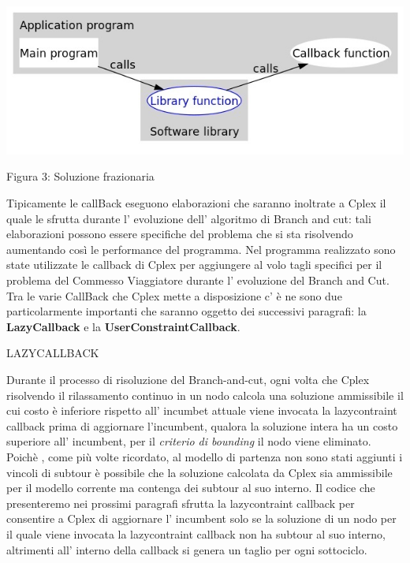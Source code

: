 \documentclass[11pt]{article}
\begin{document}
\begin{center}
\includegraphics[scale=0.5]{Callback}  

Figura 3: Soluzione frazionaria
\end{center}


Tipicamente le callBack eseguono elaborazioni che saranno inoltrate a Cplex il quale le sfrutta durante l' evoluzione dell' algoritmo di Branch and cut: tali elaborazioni possono essere specifiche del problema che si sta risolvendo aumentando così le performance del programma. Nel programma realizzato sono state utilizzate le callback di Cplex per aggiungere al volo tagli specifici per il problema del Commesso Viaggiatore durante l' evoluzione del Branch and Cut.
Tra le varie CallBack che Cplex mette a disposizione c' è ne sono due particolarmente importanti che saranno oggetto dei successivi paragrafi: la \textbf{LazyCallback} e la \textbf{UserConstraintCallback}.


\vspace{2\baselineskip}
LAZYCALLBACK
\vspace{2\baselineskip}

Durante il processo di risoluzione del Branch-and-cut, ogni volta che Cplex risolvendo il rilassamento continuo in un nodo calcola una soluzione ammissibile il cui costo è inferiore rispetto all' incumbet attuale viene invocata la lazycontraint callback prima di aggiornare l'incumbent, qualora la soluzione intera ha un costo superiore all' incumbent, per il \textit{criterio di bounding} il nodo viene eliminato. Poichè , come più volte ricordato, al modello di partenza non sono stati aggiunti i vincoli di subtour è possibile che la soluzione calcolata da Cplex sia ammissibile per il modello corrente ma contenga dei subtour al suo interno.  Il codice che presenteremo nei prossimi paragrafi sfrutta la lazycontraint callback per consentire a Cplex di aggiornare l' incumbent  solo se la soluzione di un nodo per il quale viene invocata la lazycontraint callback non ha subtour al suo interno, altrimenti all' interno della callback si genera un taglio per ogni sottociclo.
\end{document}
